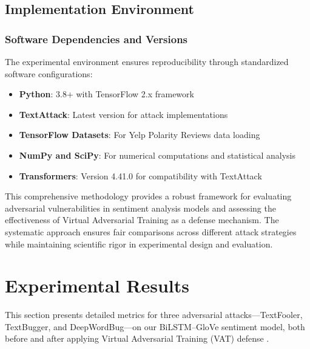 \documentclass[../main.tex]{subfiles}
\begin{document}
\subsection{Implementation Environment}

\subsubsection{Software Dependencies and Versions}

The experimental environment ensures reproducibility through standardized software configurations:

\begin{itemize}
\item \textbf{Python}: 3.8+ with TensorFlow 2.x framework
\item \textbf{TextAttack}: Latest version for attack implementations
\item \textbf{TensorFlow Datasets}: For Yelp Polarity Reviews data loading
\item \textbf{NumPy and SciPy}: For numerical computations and statistical analysis
\item \textbf{Transformers}: Version 4.41.0 for compatibility with TextAttack
\end{itemize}


This comprehensive methodology provides a robust framework for evaluating adversarial vulnerabilities in sentiment analysis models and assessing the effectiveness of Virtual Adversarial Training as a defense mechanism. The systematic approach ensures fair comparisons across different attack strategies while maintaining scientific rigor in experimental design and evaluation.

\section{Experimental Results}

This section presents detailed metrics for three adversarial attacks—TextFooler, TextBugger, and DeepWordBug—on our BiLSTM–GloVe sentiment model, both before and after applying Virtual Adversarial Training (VAT) defense \cite{jin2019textfooler}\cite{li2018textbugger}\cite{gao2018deepwordbug}.
\end{document}
